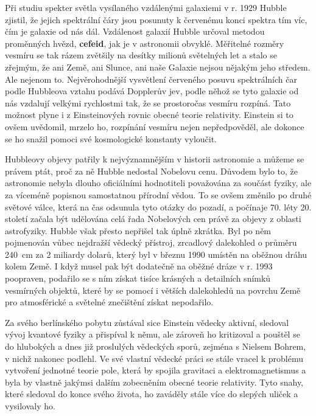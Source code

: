         Při studiu spekter světla vysílaného vzdálenými galaxiemi v r. 1929 Hubble zjistil, že
        jejich spektrální čáry jsou posunuty k červenému konci spektra tím víc, čím je galaxie od
        nás dál. Vzdálenost galaxií Hubble určoval metodou proměnných hvězd, \textbf{cefeid}, jak
        je v astronomii obvyklé. Měřitelné rozměry vesmíru se tak rázem zvětšily na desítky milionů
        světelných let a stalo se zřejmým, že ani Země, ani Slunce, ani naše Galaxie nejsou nějakým
        jeho středem. Ale nejenom to. Nejvěrohodnější vysvětlení červeného posuvu spektrálních čar
        podle Hubbleova vztahu podává Dopplerův jev, podle něhož se tyto galaxie od nás vzdalují
        velkými rychlostmi tak, že se prostoročas vesmíru rozpíná. Tato možnost plyne i z
        Einsteinových rovnic obecné teorie relativity. Einstein si to ovšem uvědomil, mrzelo ho,
        rozpínání vesmíru nejen nepředpověděl, ale dokonce se ho snažil pomoci své kosmologické
        konstanty vyloučit.

        Hubbleovy objevy patřily k nejvýznamnějším v historii astronomie a můžeme se právem ptát,
        proč za ně Hubble nedostal Nobelovu cenu. Důvodem bylo to, že astronomie nebyla dlouho
        oficiálními hodnotiteli považována za součást fyziky, ale za víceméně popisnou samostatnou
        přírodní vědou. To se ovšem změnilo po druhé světové válce, která na čas odsunula tyto
        otázky do pozadí, a počínaje 70. léty 20. století začala být udělována celá řada Nobelových
        cen právě za objevy z oblasti astrofyziky. Hubble však přesto nepřišel tak úplně zkrátka.
        Byl po něm pojmenován vůbec nejdražší vědecký přístroj, zrcadlový dalekohled o průměru
        \SI{240}{\cm} za 2 miliardy dolarů, který byl v březnu 1990 umístěn na oběžnou dráhu kolem
        Země. I když musel pak být dodatečně na oběžné dráze v r. 1993 poopraven, podařilo se s ním
        získat tisíce krásných a detailních snímků vesmírných objektů, které by se pomocí i větších
        dalekohledů na povrchu Země pro atmosférické a světelné znečištění získat nepodařilo.

        Za svého berlínského pobytu zůstával sice Einstein vědecky aktivní, sledoval vývoj kvantové
        fyziky a přispíval k němu, ale zároveň ho kritizoval a pouštěl se do hlubokých a dnes již
        proslulých vědeckých sporů, zejména s Nielsem Bohrem, v nichž nakonec podlehl. Ve své
        vlastní vědecké práci se stále vracel k problému vytvoření jednotné teorie pole, která by
        spojila gravitaci a elektromagnetismus a byla by vlastně jakýmsi dalším zobecněním obecné
        teorie relativity. Tyto snahy, které sledoval do konce svého života, ho zaváděly stále více
        do slepých uliček a vysilovaly ho.

